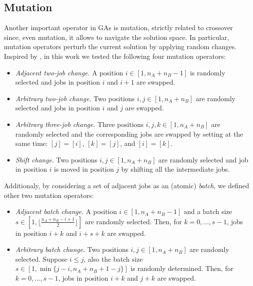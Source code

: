 \documentclass[opre,nonblindrev]{informs3} %
\begin{document}
\subsection{Mutation}
Another important operator in GAs is mutation, strictly related to crossover since, even mutation, it allows to navigate the solution space. In particular, mutation operators perturb the current solution by applying random changes.
Inspired by \cite{sched1}, in this work we tested the following four mutation operators:
\begin{itemize}
	\item \textit{Adjacent two-job change.} A position $i \in [1,n_A+n_B-1]$ is randomly selected and jobs in position $i$ and $i+1$ are swapped.
	\item \textit{Arbitrary two-job change.} Two positions $i,j \in [1,n_A+n_B]$ are randomly selected and jobs in position $i$ and $j$ are swapped.
	\item \textit{Arbitrary three-job change.} Three positions $i,j,k \in [1,n_A+n_B]$ are randomly selected and the corresponding jobs are swapped by setting at the same time: $[j] = [i]$, $[k] = [j]$, and $[i] = [k]$. 
	\item \textit{Shift change.} Two positions $i,j \in [1,n_A+n_B]$ are randomly selected and job in position $i$ is moved in position $j$ by shifting all the intermediate jobs.
\end{itemize} 
Additionaly, by considering a set of adjacent jobs as an (atomic) \textit{batch}, we defined other two mutation operators:
\begin{itemize}
	\item \textit{Adjacent batch change.} A position $i \in [1,n_A+n_B-1]$ and a batch size $s \in [1,\lfloor{\frac{n_A+n_B-i+1}{2}}\rfloor]$ are randomly selected. Then, for $k=0,\ldots,s-1$, jobs in position $i+k$ and $i+s+k$ are swapped.
	\item \textit{Arbitrary batch change.} Two positions $i,j \in [1,n_A+n_B]$ are randomly selected. Suppose $i\le j$, also the batch size $s \in [1, \min\{j-i,n_A+n_B+1-j\}]$ is randomly determined. Then, for $k=0,\ldots,s-1$, jobs in position $i+k$ and $j+k$ are swapped. 
\end{itemize}
\end{document}
